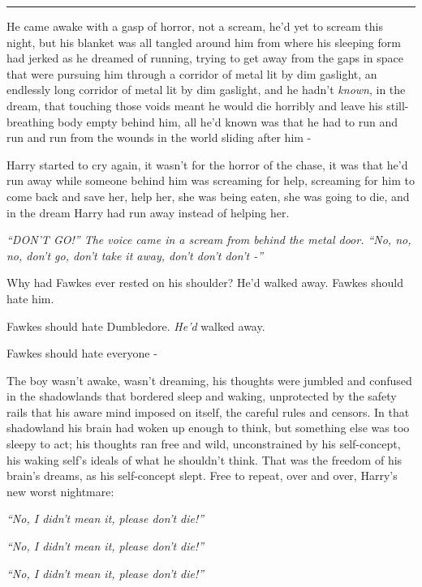 \begin{center}\rule{3in}{0.4pt}\end{center}

He came awake with a gasp of horror, not a scream, he'd yet to scream
this night, but his blanket was all tangled around him from where his
sleeping form had jerked as he dreamed of running, trying to get away
from the gaps in space that were pursuing him through a corridor of
metal lit by dim gaslight, an endlessly long corridor of metal lit by
dim gaslight, and he hadn't \emph{known}, in the dream, that touching
those voids meant he would die horribly and leave his still-breathing
body empty behind him, all he'd known was that he had to run and run and
run from the wounds in the world sliding after him -

Harry started to cry again, it wasn't for the horror of the chase, it
was that he'd run away while someone behind him was screaming for help,
screaming for him to come back and save her, help her, she was being
eaten, she was going to die, and in the dream Harry had run away instead
of helping her.

\emph{``DON'T GO!'' The voice came in a scream from behind the metal
door. ``No, no, no, don't go, don't take it away, don't don't don't -''}

Why had Fawkes ever rested on his shoulder? He'd walked away. Fawkes
should hate him.

Fawkes should hate Dumbledore. \emph{He'd} walked away.

Fawkes should hate everyone -

The boy wasn't awake, wasn't dreaming, his thoughts were jumbled and
confused in the shadowlands that bordered sleep and waking, unprotected
by the safety rails that his aware mind imposed on itself, the careful
rules and censors. In that shadowland his brain had woken up enough to
think, but something else was too sleepy to act; his thoughts ran free
and wild, unconstrained by his self-concept, his waking self's ideals of
what he shouldn't think. That was the freedom of his brain's dreams, as
his self-concept slept. Free to repeat, over and over, Harry's new worst
nightmare:

\emph{``No, I didn't mean it, please don't die!''}

\emph{``No, I didn't mean it, please don't die!''}

\emph{``No, I didn't mean it, please don't die!''}

